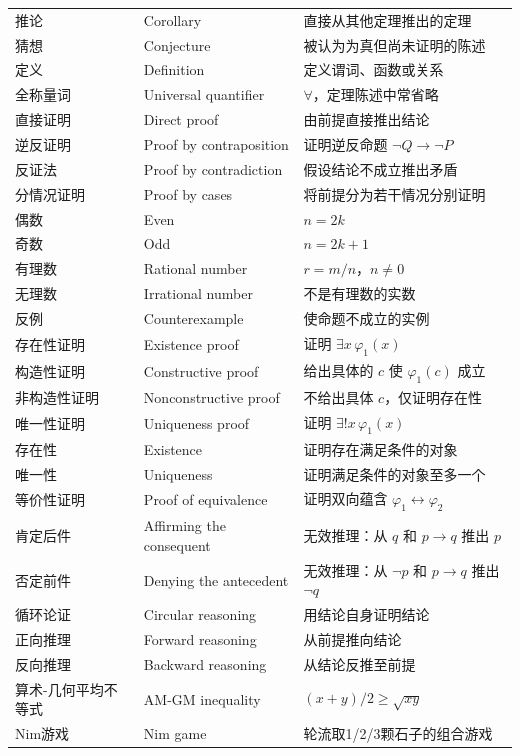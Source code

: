 \documentclass[UTF8,11pt,a4paper]{ctexbook}   %
\theoremstyle{definition}
\begin{document}
\begin{longtable}{|p{4.8cm}|p{4.8cm}|p{4.8cm}|}
推论 & Corollary & 直接从其他定理推出的定理 \\
猜想 & Conjecture & 被认为为真但尚未证明的陈述 \\
定义 & Definition & 定义谓词、函数或关系 \\
全称量词 & Universal quantifier & $\forall$，定理陈述中常省略 \\
直接证明 & Direct proof & 由前提直接推出结论 \\
逆反证明 & Proof by contraposition & 证明逆反命题 $\neg Q\to\neg P$ \\
反证法 & Proof by contradiction & 假设结论不成立推出矛盾 \\
分情况证明 & Proof by cases & 将前提分为若干情况分别证明 \\
偶数 & Even & $n=2k$ \\
奇数 & Odd & $n=2k+1$ \\
有理数 & Rational number & $r=m/n$，$n\neq 0$ \\
无理数 & Irrational number & 不是有理数的实数 \\
反例 & Counterexample & 使命题不成立的实例 \\
存在性证明 & Existence proof & 证明 $\exists x\,\varphi_1(x)$ \\
构造性证明 & Constructive proof & 给出具体的 $c$ 使 $\varphi_1(c)$ 成立 \\
非构造性证明 & Nonconstructive proof & 不给出具体 $c$，仅证明存在性 \\
唯一性证明 & Uniqueness proof & 证明 $\exists!x\,\varphi_1(x)$ \\
存在性 & Existence & 证明存在满足条件的对象 \\
唯一性 & Uniqueness & 证明满足条件的对象至多一个 \\
等价性证明 & Proof of equivalence & 证明双向蕴含 $\varphi_1 \leftrightarrow \varphi_2$ \\
肯定后件 & Affirming the consequent & 无效推理：从 $q$ 和 $p\to q$ 推出 $p$ \\
否定前件 & Denying the antecedent & 无效推理：从 $\neg p$ 和 $p\to q$ 推出 $\neg q$ \\
循环论证 & Circular reasoning & 用结论自身证明结论 \\
正向推理 & Forward reasoning & 从前提推向结论 \\
反向推理 & Backward reasoning & 从结论反推至前提 \\
算术-几何平均不等式 & AM-GM inequality & $(x+y)/2 \geq \sqrt{xy}$ \\
Nim游戏 & Nim game & 轮流取1/2/3颗石子的组合游戏 \\

\end{longtable}
\end{document}
